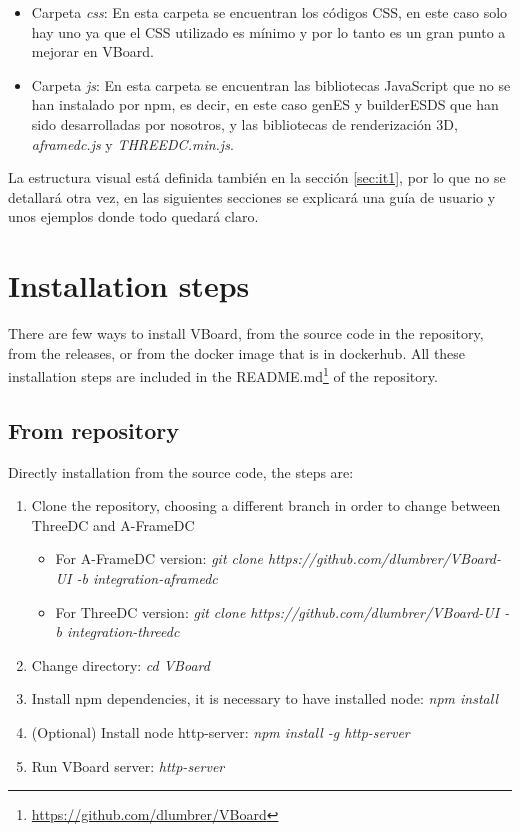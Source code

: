 \documentclass[a4paper, 12pt]{book}
\begin{document}
\begin{itemize}
    \item Carpeta \textit{css}: En esta carpeta se encuentran los códigos CSS, en este caso solo hay uno ya que el CSS utilizado es mínimo y por lo tanto es un gran punto a mejorar en VBoard.
    \item Carpeta \textit{js}: En esta carpeta se encuentran las bibliotecas JavaScript que no se han instalado por npm, es decir, en este caso genES y builderESDS que han sido desarrolladas por nosotros, y las bibliotecas de renderización 3D, \textit{aframedc.js} y \textit{THREEDC.min.js}. 
\end{itemize}

La estructura visual está definida también en la sección \ref{sec:it1}, por lo que no se detallará otra vez, en las siguientes secciones se explicará una guía de usuario y unos ejemplos donde todo quedará claro. 


\section{Installation steps}
There are few ways to install VBoard, from the source code in the repository, from the releases, or from the docker image that is in dockerhub. All these installation steps are included in the README.md\footnote{\url{https://github.com/dlumbrer/VBoard}} of the repository.

\subsection{From repository}
Directly installation from the source code, the steps are:
\begin{enumerate}
    \item Clone the repository, choosing a different branch in order to change between ThreeDC and A-FrameDC
    \begin{itemize}
        \item For A-FrameDC version: \textit{git clone https://github.com/dlumbrer/VBoard-UI -b integration-aframedc}
        \item For ThreeDC version: \textit{git clone https://github.com/dlumbrer/VBoard-UI -b integration-threedc}
    \end{itemize}
    \item Change directory: \textit{cd VBoard}
    \item Install npm dependencies, it is necessary to have installed node: \textit{npm install}
    \item (Optional) Install node http-server: \textit{npm install -g http-server}
    \item Run VBoard server: \textit{http-server}
\end{enumerate}
\end{document}
